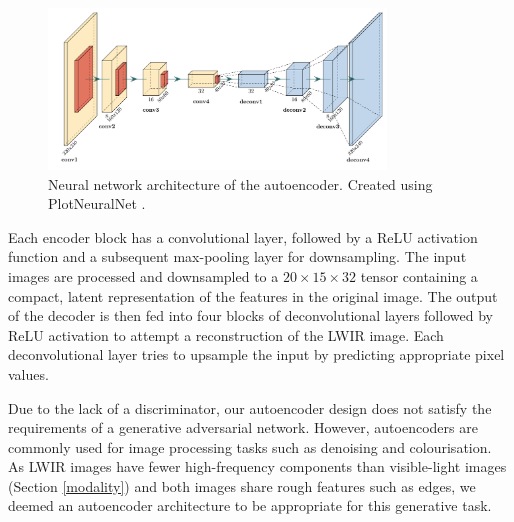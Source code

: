 \documentclass{l4proj}
\begin{document}
\begin{figure}[ht]
  \centering
  \includegraphics[width=0.8\textwidth]{images/models/autoencoder}
  \caption{Neural network architecture of the autoencoder. Created using PlotNeuralNet \citep{iqbal_harisiqbal88plotneuralnet_2018}.}
  \label{fig:autoencoder_architecture}
\end{figure}

Each encoder block has a convolutional layer, followed by a ReLU activation function and a subsequent max-pooling layer for downsampling. The input images are processed and downsampled to a $20 \times 15 \times 32$ tensor containing a compact, latent representation of the features in the original image. The output of the decoder is then fed into four blocks of deconvolutional layers followed by ReLU activation to attempt a reconstruction of the LWIR image. Each deconvolutional layer tries to upsample the input by predicting appropriate pixel values.

Due to the lack of a discriminator, our autoencoder design does not satisfy the requirements of a generative adversarial network. However, autoencoders are commonly used for image processing tasks such as denoising and colourisation. As LWIR images have fewer high-frequency components than visible-light images (Section \ref{modality}) and both images share rough features such as edges, we deemed an autoencoder architecture to be appropriate for this generative task.
\end{document}
